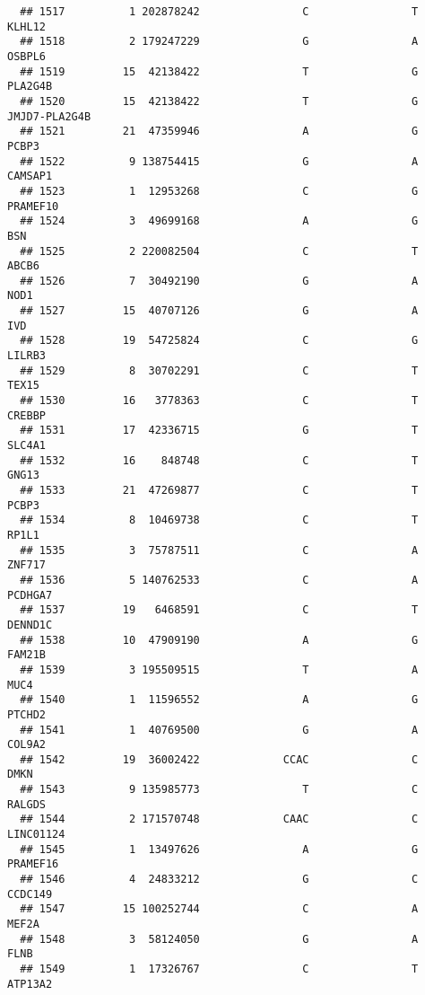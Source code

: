 \documentclass[12pt,twoside]{reedthesis}
\theoremstyle{definition}
\theoremstyle{definition}
\theoremstyle{remark}
\begin{document}
\begin{verbatim}
  ## 1517          1 202878242                C                T         KLHL12
  ## 1518          2 179247229                G                A         OSBPL6
  ## 1519         15  42138422                T                G        PLA2G4B
  ## 1520         15  42138422                T                G  JMJD7-PLA2G4B
  ## 1521         21  47359946                A                G          PCBP3
  ## 1522          9 138754415                G                A        CAMSAP1
  ## 1523          1  12953268                C                G       PRAMEF10
  ## 1524          3  49699168                A                G            BSN
  ## 1525          2 220082504                C                T          ABCB6
  ## 1526          7  30492190                G                A           NOD1
  ## 1527         15  40707126                G                A            IVD
  ## 1528         19  54725824                C                G         LILRB3
  ## 1529          8  30702291                C                T          TEX15
  ## 1530         16   3778363                C                T         CREBBP
  ## 1531         17  42336715                G                T         SLC4A1
  ## 1532         16    848748                C                T          GNG13
  ## 1533         21  47269877                C                T          PCBP3
  ## 1534          8  10469738                C                T          RP1L1
  ## 1535          3  75787511                C                A         ZNF717
  ## 1536          5 140762533                C                A        PCDHGA7
  ## 1537         19   6468591                C                T        DENND1C
  ## 1538         10  47909190                A                G         FAM21B
  ## 1539          3 195509515                T                A           MUC4
  ## 1540          1  11596552                A                G         PTCHD2
  ## 1541          1  40769500                G                A         COL9A2
  ## 1542         19  36002422             CCAC                C           DMKN
  ## 1543          9 135985773                T                C         RALGDS
  ## 1544          2 171570748             CAAC                C      LINC01124
  ## 1545          1  13497626                A                G       PRAMEF16
  ## 1546          4  24833212                G                C        CCDC149
  ## 1547         15 100252744                C                A          MEF2A
  ## 1548          3  58124050                G                A           FLNB
  ## 1549          1  17326767                C                T        ATP13A2

\end{verbatim}
\end{document}
